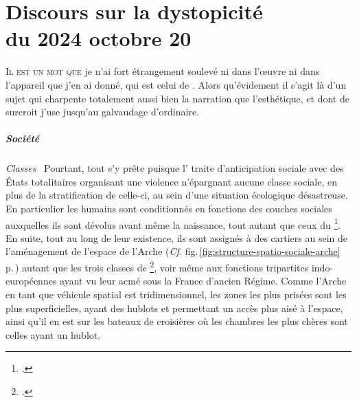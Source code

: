 \chapter[Discours sur la dystopicité]{Discours sur la dystopicité\\du 2024 octobre 20}

\lettrine[lines=3]%
{I}{l est un mot que} je n’ai fort étrangement soulevé ni dans l’œuvre ni dans l’appareil que j’en ai donné, qui est celui de . Alors qu’évidement il s’agit là d’un sujet qui charpente totalement aussi bien la narration que l’esthétique, et dont de surcroit j’use jusqu’au galvaudage d’ordinaire.

\paragraph{Société}
{\em\normalsize Classes}~
Pourtant, tout s’y prête puisque l’ traite d’anticipation sociale avec des États totalitaires organisant une violence n’épargnant aucune classe sociale, en plus de la stratification de celle-ci, au sein d’une situation écologique désastreuse. En particulier  les humains sont conditionnés en fonctions des couches sociales auxquelles ils sont dévolus avant même la naissance, tout autant que ceux du \footcite{meilleurDesMondes}. En suite, tout au long de leur existence, ils sont assignés à des cartiers au sein de l’aménagement de l’espace de l’Arche (\emph{Cf.} fig.\,\ref{fig:structure-spatio-sociale-arche} p.\,\pageref{fig:structure-spatio-sociale-arche}) autant que les trois classes de \footcite{1984}, voir même aux fonctions tripartites indo-européennes ayant vu leur acmé sous la France d’ancien Régime. Comme l’Arche en tant que véhicule spatial est tridimensionnel, les zones les plus prisées sont les plus superficielles, ayant des hublots et permettant un accès plus aisé à l’espace, ainsi qu’il en est sur les bateaux de croisières où les chambres les plus chères sont celles ayant un hublot.

